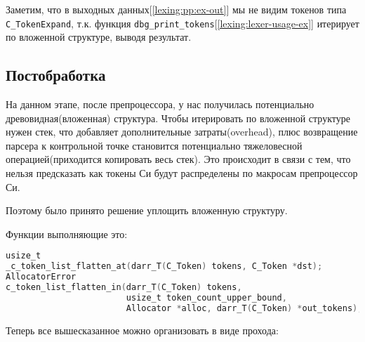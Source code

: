 Заметим, что в выходных данных[\ref{lexing:pp:ex-out}] мы не видим токенов типа \verb|C_TokenExpand|, 
т.к. функция \verb|dbg_print_tokens|[\ref{lexing:lexer-usage-ex}] итерирует по вложенной структуре, выводя  результат.

\subsection{Постобработка}

На данном этапе, после препроцессора, у нас получилась потенциально древовидная(вложенная) структура.
Чтобы итерировать по вложенной структуре нужен стек, что добавляет дополнительные затраты(overhead), 
плюс возвращение парсера к контрольной точке становится потенциально тяжеловесной операцией(приходится копировать весь стек).
Это происходит в связи с тем, что нельзя предсказать как токены Си будут распределены по макросам препроцессор Си.






Поэтому было принято решение уплощить вложенную структуру.

Функции выполняющие это:
\begin{lstlisting}[language=c, caption={Заголовки функций уплощения}, label={lexing:flat-fns}]
usize_t
_c_token_list_flatten_at(darr_T(C_Token) tokens, C_Token *dst);
AllocatorError
c_token_list_flatten_in(darr_T(C_Token) tokens, 
                        usize_t token_count_upper_bound, 
                        Allocator *alloc, darr_T(C_Token) *out_tokens); 
\end{lstlisting}


Теперь все вышесказанное можно организовать в виде прохода:

